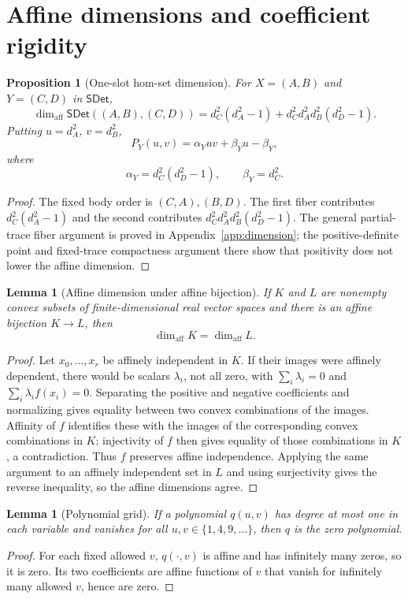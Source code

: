 \documentclass[11pt,a4paper]{article}
\theoremstyle{definition}
\theoremstyle{plain}
\newtheorem{lemma}[theorem]{Lemma}
\newtheorem{proposition}[theorem]{Proposition}
\theoremstyle{remark}
\newcommand{\affdim}{\dim_{\mathrm{aff}}}
\newcommand{\SDet}{\mathsf{SDet}}
\begin{document}
\section{Affine dimensions and coefficient rigidity}

\begin{proposition}[One-slot hom-set dimension]
\label{prop:hom-dim}
For $X=(A,B)$ and $Y=(C,D)$ in $\SDet$,
\[
\affdim\SDet((A,B),(C,D))
=d_C^2(d_A^2-1)+d_C^2d_A^2d_B^2(d_D^2-1).
\]
Putting $u=d_A^2$, $v=d_B^2$,
\[
P_Y(u,v)=\alpha_Yuv+\beta_Yu-\beta_Y,
\]
where
\[
\alpha_Y=d_C^2(d_D^2-1),
\qquad \beta_Y=d_C^2.
\]
\end{proposition}
\begin{proof}
The fixed body order is $(C,A),(B,D)$. The first fiber contributes
$d_C^2(d_A^2-1)$ and the second contributes
$d_C^2d_A^2d_B^2(d_D^2-1)$. The general partial-trace fiber argument is
proved in Appendix~\ref{app:dimension}; the positive-definite point and
fixed-trace compactness argument there show that positivity does not
lower the affine dimension.
\end{proof}

\begin{lemma}[Affine dimension under affine bijection]
If $K$ and $L$ are nonempty convex subsets of finite-dimensional real
vector spaces and there is an affine bijection $K\to L$, then
\[
\affdim K=\affdim L.
\]
\end{lemma}
\begin{proof}
Let $x_0,\ldots,x_r$ be affinely independent in $K$. If their images
were affinely dependent, there would be scalars $\lambda_i$, not all zero,
with $\sum_i\lambda_i=0$ and $\sum_i\lambda_i f(x_i)=0$. Separating the
positive and negative coefficients and normalizing gives equality between
two convex combinations of the images. Affinity of $f$ identifies these
with the images of the corresponding convex combinations in $K$;
injectivity of $f$ then gives equality of those combinations in $K$, a
contradiction. Thus $f$ preserves affine independence. Applying the same
argument to an affinely independent set in $L$ and using surjectivity gives
the reverse inequality, so the affine dimensions agree.
\end{proof}

\begin{lemma}[Polynomial grid]
If a polynomial $q(u,v)$ has degree at most one in each variable and
vanishes for all $u,v\in\{1,4,9,\ldots\}$, then $q$ is the zero polynomial.
\end{lemma}
\begin{proof}
For each fixed allowed $v$, $q(\cdot,v)$ is affine and has infinitely many
zeros, so it is zero. Its two coefficients are affine functions of $v$
that vanish for infinitely many allowed $v$, hence are zero.
\end{proof}
\end{document}
